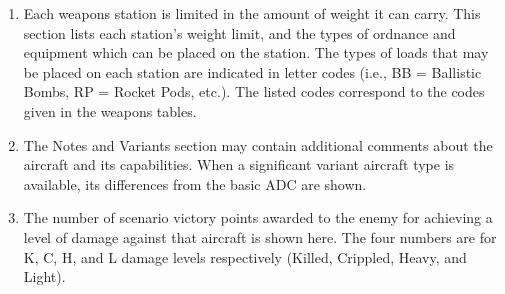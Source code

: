 \begin{enumerate}[resume]
    \item {} 
    Each weapons station is limited in the amount of weight it can carry. This section lists each station's weight limit, and the types of ordnance and equipment which can be placed on the station. The types of loads that may be placed on each station are indicated in letter codes (i.e., BB = Ballistic Bombs, RP = Rocket Pods, etc.). The listed codes correspond to the codes given in the weapons tables.

    \item {} 
    The Notes and Variants section may contain additional comments about the aircraft and its capabilities. When a significant variant aircraft type is available, its differences from the basic ADC are shown.

    \item {} 
    The number of scenario victory points awarded to the enemy for achieving a level of damage against that aircraft is shown here. The four numbers are for K, C, H, and L damage levels respectively (Killed, Crippled, Heavy, and Light).

\end{enumerate}

